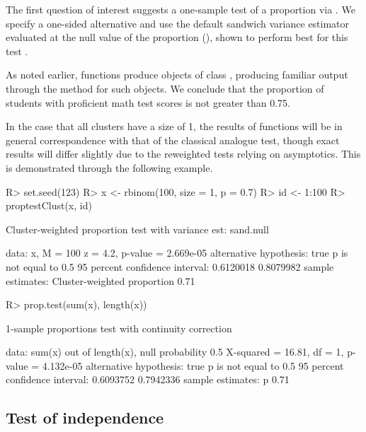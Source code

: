 The first question of interest suggests a one-sample test of a proportion via . We specify a one-sided alternative and use the default sandwich variance estimator evaluated at the null value of the proportion (), shown to perform best for this test \citep{gregg20}.
As noted earlier,  functions produce objects of class , producing familiar output through the  method for such objects. We conclude that the proportion of students with proficient math test scores is not greater than 0.75.

In the case that all clusters have a size of 1, the results of  functions will be in general correspondence with that of the classical analogue test, though exact results will differ slightly due to the reweighted tests relying on asymptotics. This is demonstrated through the following example. 
\begin{example}
	R> set.seed(123)
	R> x <- rbinom(100, size = 1, p = 0.7)
	R> id <- 1:100
	R> proptestClust(x, id)
	
	Cluster-weighted proportion test with variance est: sand.null
	
	data:  x, M = 100
	z = 4.2, p-value = 2.669e-05
	alternative hypothesis: true p is not equal to 0.5
	95 percent confidence interval:
	0.6120018 0.8079982
	sample estimates:
	Cluster-weighted proportion 
	0.71 
	
	R> prop.test(sum(x), length(x))
	
	1-sample proportions test with continuity correction
	
	data:  sum(x) out of length(x), null probability 0.5
	X-squared = 16.81, df = 1, p-value = 4.132e-05
	alternative hypothesis: true p is not equal to 0.5
	95 percent confidence interval:
	0.6093752 0.7942336
	sample estimates:
	p 
	0.71 
\end{example}

\subsection[Independence test]{Test of independence}


